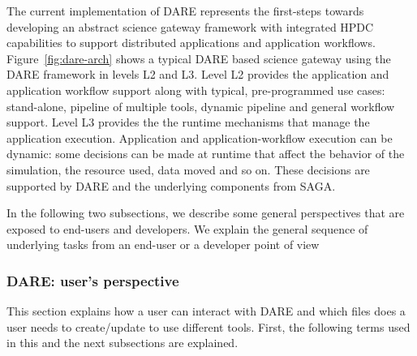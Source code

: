 \documentclass[]{svjour3}
\begin{document}
The current implementation of DARE represents the first-steps towards developing
an abstract science gateway framework with integrated HPDC capabilities to support
distributed applications and application workflows. Figure~\ref{fig:dare-arch}
shows a typical DARE based science gateway using the DARE framework in
levels L2 and L3. Level L2 provides the application and application workflow
support along with typical, pre-programmed use cases: stand-alone, pipeline of
multiple tools, dynamic pipeline and general workflow support. Level L3 provides
the the runtime mechanisms that manage the application execution. Application
and application-workflow execution can be dynamic: some decisions can be made
at runtime that affect the behavior of the simulation, the resource used,
data moved and so on. These decisions are supported by DARE and the
underlying components from SAGA.

In the following two subsections, we describe some general perspectives
that are exposed to end-users and developers. We explain the general sequence
of underlying tasks from an end-user or a developer point of view


\subsubsection{DARE: user's perspective}

This section explains how a user can interact with DARE and which files
does a user needs to create/update to use different tools. First, the
following terms used in this and the next subsections are explained.

%
% 
% 
% 
\end{document}
